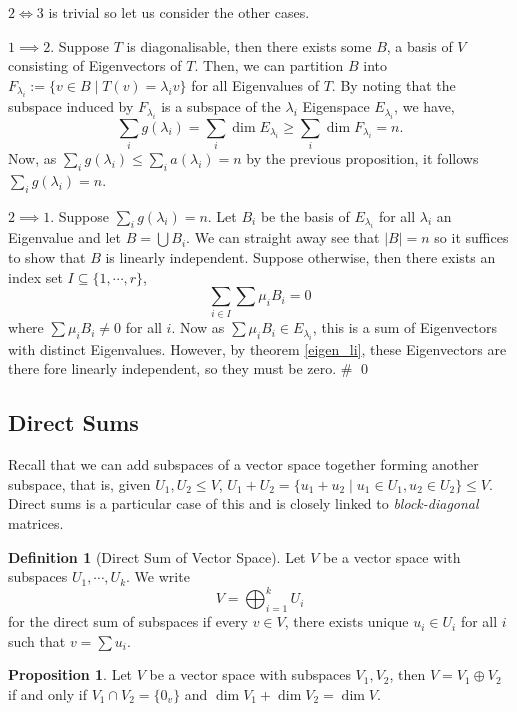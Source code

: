 \documentclass[
]{article}
\theoremstyle{definition}
\newtheorem{prop}{Proposition}[section]
\theoremstyle{definition}
\newtheorem{definition}{Definition}[section]
\begin{document}
\(2 \iff 3\) is trivial so let us consider the other cases.

\(1 \implies 2\). Suppose \(T\) is diagonalisable, then there exists
some \(B\), a basis of \(V\) consisting of Eigenvectors of \(T\). Then,
we can partition \(B\) into
\(F_{\lambda_i} := \{v \in B \mid T(v) = \lambda_i v\}\) for all
Eigenvalues of \(T\). By noting that the subspace induced by
\(F_{\lambda_i}\) is a subspace of the \(\lambda_i\) Eigenspace
\(E_{\lambda_i}\), we have,
\[\sum_i g(\lambda_i) = \sum_i \dim E_{\lambda_i} \ge \sum_i \dim F_{\lambda_i} = n.\]
Now, as \(\sum_i g(\lambda_i) \le \sum_i a(\lambda_i) = n\) by the
previous proposition, it follows \(\sum_i g(\lambda_i) = n\).

\(2 \implies 1\). Suppose \(\sum_i g(\lambda_i) = n\). Let \(B_i\) be
the basis of \(E_{\lambda_i}\) for all \(\lambda_i\) an Eigenvalue and
let \(B = \bigcup B_i\). We can straight away see that
\(\left| B \right| = n\) so it suffices to show that \(B\) is linearly
independent. Suppose otherwise, then there exists an index set
\(I \subseteq \{1, \cdots, r\}\), \[\sum_{i \in I} \sum \mu_i B_i = 0\]
where \(\sum \mu_i B_i \neq 0\) for all \(i\). Now as
\(\sum \mu_i B_i \in E_{\lambda_i}\), this is a sum of Eigenvectors with
distinct Eigenvalues. However, by theorem \ref{eigen_li}, these
Eigenvectors are there fore linearly independent, so they must be zero.
\# \qed

\hypertarget{direct-sums}{%
\subsection{Direct Sums}\label{direct-sums}}

Recall that we can add subspaces of a vector space together forming
another subspace, that is, given \(U_1, U_2 \le V\),
\(U_1 + U_2 = \{u_1 + u_2 \mid u_1 \in U_1, u_2 \in U_2\} \le V\).
Direct sums is a particular case of this and is closely linked to
\emph{block-diagonal} matrices.

\begin{definition}[Direct Sum of Vector Space]
  Let \(V\) be a vector space with subspaces \(U_1, \cdots, U_k\). We write 
  \[V = \bigoplus_{i = 1}^k U_i\]
  for the direct sum of subspaces if every \(v \in V\), there exists unique 
  \(u_i \in U_i\) for all \(i\) such that \(v = \sum u_i\).
\end{definition}

\begin{prop}
  Let \(V\) be a vector space with subspaces \(V_1, V_2\), then 
  \(V = V_1 \oplus V_2\) if and only if \(V_1 \cap V_2 = \{0_v\}\) and 
  \(\dim V_1 + \dim V_2 = \dim V\).
\end{prop}
\proof
\end{document}
